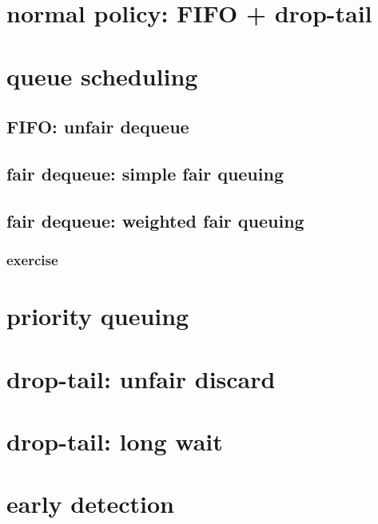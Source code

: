 \section{normal policy: FIFO + drop-tail}


\section{queue scheduling}


\subsection{FIFO: unfair dequeue} 


\subsection{fair dequeue: simple fair queuing}





\subsection{fair dequeue: weighted fair queuing}



\subsubsection{exercise}



\section{priority queuing}


\section{drop-tail: unfair discard}


\section{drop-tail: long wait}


\section{early detection}

